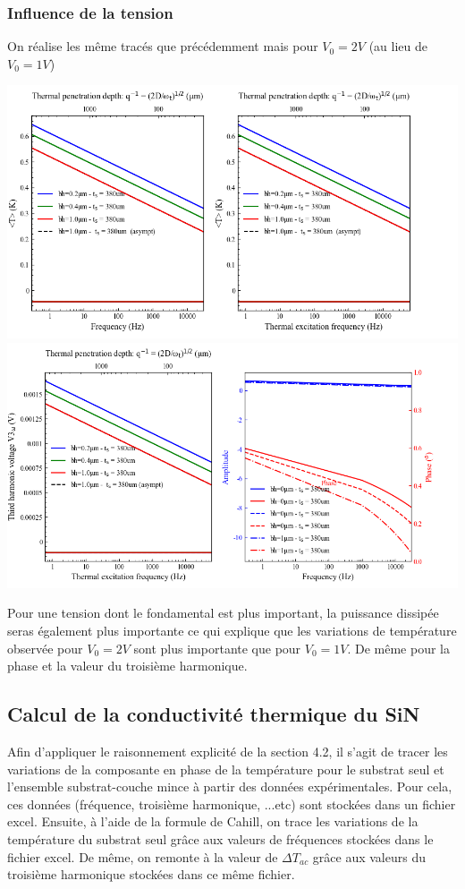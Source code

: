\documentclass[10pt,a4paper]{report}
\begin{document}
\subsubsection{Influence de la tension}
On réalise les même tracés que précédemment mais pour $V_{0}=2V$ (au lieu de $V_{0}=1V$)
\begin{center}
\includegraphics[width=\linewidth]{influence_V0.png}
\includegraphics[width=\linewidth]{influence_phaseV0.png}
\end{center}
Pour une tension dont le fondamental est plus important, la puissance dissipée seras également plus importante ce qui explique que les variations de température observée pour $V_{0}=2V$ sont plus importante que pour $V_{0}=1V$. De même pour la phase et la valeur du troisième harmonique.
\subsection{Calcul de la conductivité thermique du SiN}
Afin d'appliquer le raisonnement explicité de la section 4.2, il s'agit de tracer les variations de la composante en phase de la température pour le substrat seul et l'ensemble substrat-couche mince à partir des données expérimentales. Pour cela, ces données (fréquence, troisième harmonique, ...etc) sont stockées dans un fichier excel.
\newline
Ensuite, à l'aide de la formule de Cahill, on trace les variations de la température du substrat seul grâce aux valeurs de fréquences stockées dans le fichier excel. De même, on remonte à la valeur de $\Delta T_{ac}$ grâce aux valeurs du troisième harmonique stockées dans ce même fichier.
\end{document}

